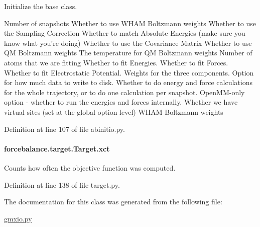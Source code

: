 Initialize the base class. 

Number of snapshots Whether to use W\-H\-A\-M Boltzmann weights Whether to use the Sampling Correction Whether to match Absolute Energies (make sure you know what you're doing) Whether to use the Covariance Matrix Whether to use Q\-M Boltzmann weights The temperature for Q\-M Boltzmann weights Number of atoms that we are fitting Whether to fit Energies. Whether to fit Forces. Whether to fit Electrostatic Potential. Weights for the three components. Option for how much data to write to disk. Whether to do energy and force calculations for the whole trajectory, or to do one calculation per snapshot. Open\-M\-M-\/only option -\/ whether to run the energies and forces internally. Whether we have virtual sites (set at the global option level) W\-H\-A\-M Boltzmann weights 

Definition at line 107 of file abinitio.\-py.

\hypertarget{classforcebalance_1_1target_1_1Target_aad2e385cfbf7b4a68f1c2cb41133fe82}{
\paragraph[{xct}]{\setlength{\rightskip}{0pt plus 5cm}forcebalance.\-target.\-Target.\-xct\hspace{0.3cm}{\ttfamily [inherited]}}}\label{classforcebalance_1_1target_1_1Target_aad2e385cfbf7b4a68f1c2cb41133fe82}


Counts how often the objective function was computed. 



Definition at line 138 of file target.\-py.



The documentation for this class was generated from the following file\-:\begin{DoxyCompactItemize}
\item 
\hyperlink{gmxio_8py}{gmxio.\-py}\end{DoxyCompactItemize}
